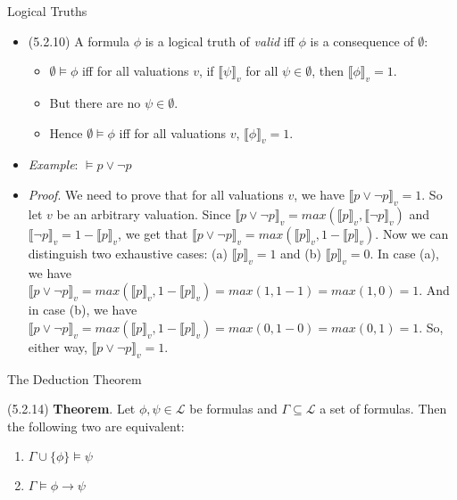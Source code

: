 \documentclass[../slides.tex]{subfiles}
\begin{document}
\begin{frame}{Logical Truths}

	\begin{itemize}
	
		\item (5.2.10) A formula $\phi$ is a logical truth of \emph{valid} iff $\phi$ is a consequence of $\emptyset$:
		
		\begin{itemize}
		
			\item $\emptyset\vDash\phi$ iff for all valuations $v$, if $\llbracket\psi\rrbracket_v$ for all $\psi\in\emptyset$, then $\llbracket\phi\rrbracket_v=1$. 
			
			\item But there are no $\psi\in\emptyset$.
			
			\item Hence $\emptyset\vDash\phi$ iff for all valuations $v$, $\llbracket\phi\rrbracket_v=1$. 

		\end{itemize}
		
		\item \emph{Example}: $\vDash p\lor\neg p$
		
		\item[] \emph{Proof}. We need to prove that for all valuations $v$, we have  $\llbracket p\lor\neg p\rrbracket_v=1$. So let $v$ be an arbitrary valuation. Since $\llbracket p\lor\neg p\rrbracket_v=max(\llbracket p\rrbracket_v,\llbracket\neg p\rrbracket_v)$ and $\llbracket \neg p\rrbracket_v=1-\llbracket p\rrbracket_v$, we get that $\llbracket p\lor\neg p\rrbracket_v=max(\llbracket p\rrbracket_v,1-\llbracket p\rrbracket_v)$. Now we can distinguish two exhaustive cases: (a) $\llbracket p\rrbracket_v=1$ and (b) $\llbracket p\rrbracket_v=0$. In case (a), we have $\llbracket p\lor\neg p\rrbracket_v=max(\llbracket p\rrbracket_v,1-\llbracket p\rrbracket_v)=max(1,1-1)=max(1,0)=1$. And in case (b), we have $\llbracket p\lor\neg p\rrbracket_v=max(\llbracket p\rrbracket_v,1-\llbracket p\rrbracket_v)=max(0, 1-0)=max(0,1)=1$. So, either way, $\llbracket p\lor\neg p\rrbracket_v=1$.	
	\end{itemize}

\end{frame}

\begin{frame}{The Deduction Theorem}

(5.2.14) \textbf{Theorem}. Let $\phi,\psi\in\mathcal{L}$ be formulas and $\Gamma\subseteq\mathcal{L}$ a set of formulas. Then the following two are equivalent:
			\begin{enumerate}[1.]
			
				\item $\Gamma\cup\{\phi\}\vDash\psi$
				
				\item $\Gamma\vDash \phi\to\psi$
			
			\end{enumerate}



\end{frame}
\end{document}
